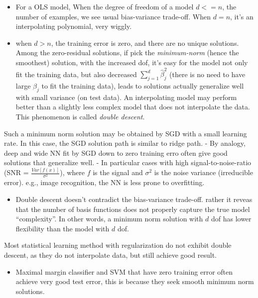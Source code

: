 \documentclass[
  letterpaper,
  DIV=11,
  numbers=noendperiod]{scrreprt}
\providecommand{\tightlist}{%
  \setlength{\itemsep}{0pt}\setlength{\parskip}{0pt}}\usepackage{longtable,booktabs,array}
\begin{document}
\begin{itemize}
\tightlist
\item
  For a OLS model, When the degree of freedom of a model \(d<=n\), the
  number of examples, we see usual bias-variance trade-off. When
  \(d=n\), it's an interpolating polynomial, very wiggly.
\item
  when \(d>n\), the training error is zero, and there are no unique
  solutions. Among the zero-residual solutions, if pick the
  \emph{minimum-norm} (hence the smoothest) solution, with the increased
  dof, it's easy for the model not only fit the training data, but also
  decreased \(\sum_{j=1}^d \hat{\beta}_j^2\) (there is no need to have
  large \(\beta_j\) to fit the training data), leads to solutions
  actually generalize well with small variance (on test data). An
  interpolating model may perform better than a slightly less complex
  model that does not interpolate the data. This phenomenon is called
  \emph{double descent}.
\end{itemize}

Such a minimum norm solution may be obtained by SGD with a small
learning rate. In this case, the SGD solution path is similar to ridge
path. - By analogy, deep and wide NN fit by SGD down to zero training
erro often give good solutions that generalize well. - In particular
cases with high signal-to-noise-ratio (SNR =
\(\frac{Var[f(x)]}{\sigma^2}\)), where \(f\) is the signal and
\(\sigma^2\) is the noise variance (irreducible error). e.g., image
recognition, the NN is less prone to overfitting.

\begin{itemize}
\tightlist
\item
  Double descent doesn't contradict the bias-variance trade-off. rather
  it reveas that the number of basis functions does not properly capture
  the true model ``complexity''. In other words, a minimum norm solution
  with \(d\) dof has lower flexibility than the model with \(d\) dof.
\end{itemize}

Most statistical learning method with regularization do not exhibit
double descent, as they do not interpolate data, but still achieve good
result.

\begin{itemize}
\tightlist
\item
  Maximal margin classifier and SVM that have zero training error often
  achieve very good test error, this is because they seek smooth minimum
  norm solutions.
\end{itemize}
\end{document}
